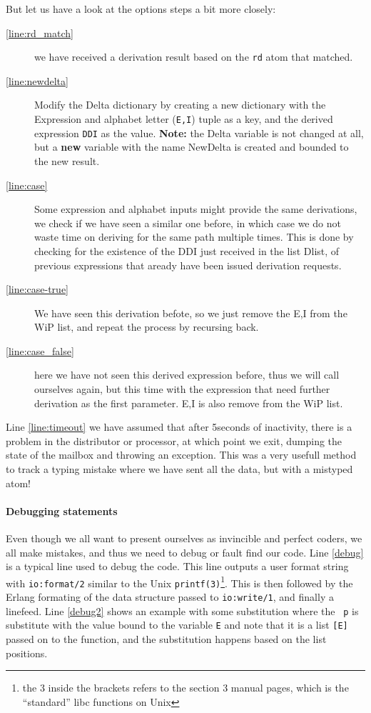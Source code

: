 But let us have a look at the options steps a bit more closely:
\begin{description}
\item[\ref{line:rd_match}] we have received a derivation result based
  on the \texttt{rd} atom that matched.
\item[\ref{line:newdelta}] Modify the Delta dictionary by creating a
  new  dictionary with the Expression and alphabet letter
  (\texttt{{E,I}}) tuple as a key, and the derived expression
  \texttt{DDI} as the value. \textbf{Note:} the Delta variable is not
  changed at all, but a \textbf{new} variable with the name NewDelta
  is created and bounded to the new result.
\item[\ref{line:case}] Some expression and alphabet inputs might
  provide the same derivations, we check if we have seen a similar one
  before, in which case we do not waste time on deriving for the same
  path multiple times. This is done by checking for the existence of
  the DDI just received in the list Dlist, of previous expressions that
  aready have been issued derivation requests.
\item[\ref{line:case-true}] We have seen this derivation befote, so we
  just remove the {E,I} from the WiP list, and repeat the process by
  recursing back.
\item[\ref{line:case_false}] here we have not seen this derived
  expression before, thus we will call ourselves again, but this time
  with the expression that need further derivation as the first
  parameter. {E,I} is also remove from the WiP list.
\end{description}

Line \ref{line:timeout} we have assumed that after 5seconds of
inactivity, there is a problem in the distributor or processor, at
which point we exit, dumping the state of the mailbox and throwing an
exception. This was a very usefull method to track a typing mistake
where we have sent all the data, but with a mistyped atom!


\paragraph{Debugging statements}

Even though we all want to present ourselves as invincible and perfect
coders, we all make mistakes, and thus we need to debug or fault find
our code. Line \ref{debug} is a typical line used to debug the
code. This line outputs a user format string with \texttt{io:format/2} similar to the Unix
\texttt{printf(3)}\footnote{the 3 inside the brackets refers to the
  section 3 manual pages, which is the ``standard'' libc functions
  on Unix}. This is  then followed by the Erlang formating of the
data structure passed to \texttt{io:write/1}, and finally a
linefeed. Line \ref{debug2} shows an example with some substitution
where the \texttt{~p} is substitute with the value bound to the
variable \texttt{E} and note that it is a list \texttt{[E]} passed on
to the function, and the substitution happens based on the list positions.

